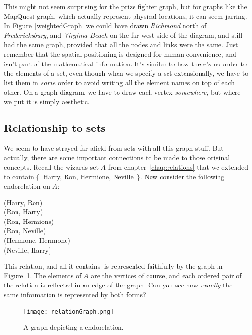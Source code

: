 This might not seem surprising for the prize fighter graph, but for graphs
like the MapQuest graph, which actually represent physical locations, it
can seem jarring. In Figure~\ref{weightedGraph} we could have drawn
\textsl{Richmond} north of \textsl{Fredericksburg}, and \textsl{Virginia
Beach} on the far west side of the diagram, and still had the same graph,
provided that all the nodes and links were the same. Just remember that the
spatial positioning is designed for human convenience, and isn't part of
the mathematical information. It's similar to how there's no order to the
elements of a set, even though when we specify a set extensionally, we have
to list them in \textit{some} order to avoid writing all the element names
on top of each other. On a graph diagram, we have to draw each vertex
\textit{somewhere}, but where we put it is simply aesthetic.


\subsection{Relationship to sets}

We seem to have strayed far afield from sets with all this graph stuff. But
actually, there are some important connections to be made to those original
concepts. Recall the wizards set $A$ from chapter~\ref{chap:relations}
that we extended to contain \{~Harry, Ron, Hermione, Neville~\}. Now
consider the following endorelation on $A$:

\begin{center}
(Harry, Ron) \\
(Ron, Harry) \\
(Ron, Hermione) \\
(Ron, Neville) \\
(Hermione, Hermione) \\
(Neville, Harry)
\end{center}

This relation, and all it contains, is represented faithfully by the graph
in Figure~\ref{relationgraph}. The elements of $A$ are the vertices of
course, and each ordered pair of the relation is reflected in an edge of
the graph. Can you see how \textit{exactly} the same information is
represented by both forms?

\begin{figure}[ht]
\centering
\texttt{[image: relationGraph.png]}
\caption{A graph depicting a endorelation.}
\label{relationgraph}
\end{figure}

